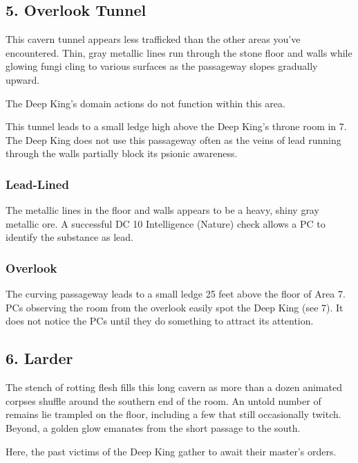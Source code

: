\documentclass[10pt,a4paper,twoside,bg=print,twocolumn,openany,nodeprecatedcode]{dndbook}
\begin{document}
\subsection{5. Overlook Tunnel}
\begin{DndReadAloud}{}
This cavern tunnel appears less trafficked than the other areas you've encountered. Thin, gray metallic lines run through the stone floor and walls while glowing fungi cling to various surfaces as the passageway slopes gradually upward.

\end{DndReadAloud}

The Deep King's domain actions do not function within this area.

This tunnel leads to a small ledge high above the Deep King's throne room in 7. The Deep King does not use this passageway often as the veins of lead running through the walls partially block its psionic awareness.

\subsubsection{Lead-Lined}
The metallic lines in the floor and walls appears to be a heavy, shiny gray metallic ore. A successful DC 10 Intelligence (Nature) check allows a PC to identify the substance as lead.

\subsubsection{Overlook}
The curving passageway leads to a small ledge 25 feet above the floor of Area 7. PCs observing the room from the overlook easily spot the Deep King (see 7). It does not notice the PCs until they do something to attract its attention.

\subsection{6. Larder}
\begin{DndReadAloud}{}
The stench of rotting flesh fills this long cavern as more than a dozen animated corpses shuffle around the southern end of the room. An untold number of remains lie trampled on the floor, including a few that still occasionally twitch. Beyond, a golden glow emanates from the short passage to the south.

\end{DndReadAloud}

Here, the past victims of the Deep King gather to await their master's orders.
\end{document}
